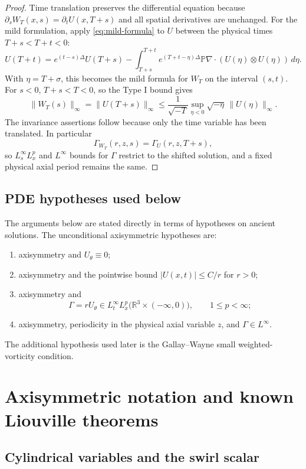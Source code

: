 \documentclass[11pt]{amsart}
\theoremstyle{plain}
\theoremstyle{definition}
\theoremstyle{remark}
\numberwithin{equation}{section}
\begin{document}
\begin{proof}
Time translation preserves the differential equation because
\(\partial_sW_T(x,s)=\partial_tU(x,T+s)\) and all spatial derivatives are
unchanged.  For the mild formulation, apply \eqref{eq:mild-formula} to \(U\)
between the physical times \(T+s<T+t<0\):
\[
   U(T+t)=e^{(t-s)\Delta}U(T+s)
   -\int_{T+s}^{T+t}e^{(T+t-\eta)\Delta}\mathbb P\nabla\cdot
      (U(\eta)\otimes U(\eta))\,d\eta .
\]
With \(\eta=T+\sigma\), this becomes the mild formula for \(W_T\) on the
interval \((s,t)\).  For \(s<0\), \(T+s<T<0\), so the Type I bound gives
\[
   \|W_T(s)\|_\infty
   =
   \|U(T+s)\|_\infty
   \le
   \frac1{\sqrt{-T}}
   \sup_{\eta<0}\sqrt{-\eta}\,\|U(\eta)\|_\infty .
\]
The invariance assertions follow because only the time variable has been
translated.  In particular
\[
   \Gamma_{W_T}(r,z,s)=\Gamma_U(r,z,T+s),
\]
so \(L_s^\infty L_x^p\) and \(L^\infty\) bounds for \(\Gamma\) restrict to the
shifted solution, and a fixed physical axial period remains the same.
\end{proof}

\subsection{PDE hypotheses used below}

The arguments below are stated directly in terms of hypotheses on ancient
solutions.  The unconditional axisymmetric hypotheses are:
\begin{enumerate}[label=\textup{(\roman*)}]
\item axisymmetry and \(U_\theta\equiv0\);
\item axisymmetry and the pointwise bound \(|U(x,t)|\le C/r\) for \(r>0\);
\item axisymmetry and
\[
   \Gamma=rU_\theta\in L_t^\infty L_x^p
   \bigl(\mathbb R^3\times(-\infty,0)\bigr),
   \qquad 1\le p<\infty;
\]
\item axisymmetry, periodicity in the physical axial variable \(z\), and
\(\Gamma\in L^\infty\).
\end{enumerate}
The additional hypothesis used later is the Gallay--Wayne small
weighted-vorticity condition.

\section{Axisymmetric notation and known Liouville theorems}
\label{sec:axisymmetric-liouville-theorems}

\subsection{Cylindrical variables and the swirl scalar}
\end{document}
